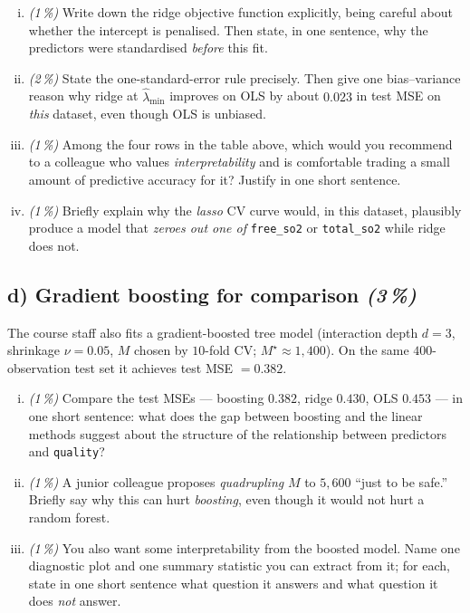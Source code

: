 \documentclass[11pt,a4paper]{article}
\newcommand{\subpoints}[1]{\textit{(#1\,\%)}}
\begin{document}
\begin{enumerate}[(i)]
  \item \subpoints{1} Write down the ridge objective function explicitly, being careful about whether the intercept is penalised. Then state, in one sentence, why the predictors were standardised \emph{before} this fit.

  \item \subpoints{2} State the one-standard-error rule precisely. Then give one bias--variance reason why ridge at $\hat\lambda_{\min}$ improves on OLS by about $0.023$ in test MSE on \emph{this} dataset, even though OLS is unbiased.

  \item \subpoints{1} Among the four rows in the table above, which would you recommend to a colleague who values \emph{interpretability} and is comfortable trading a small amount of predictive accuracy for it? Justify in one short sentence.

  \item \subpoints{1} Briefly explain why the \emph{lasso} CV curve would, in this dataset, plausibly produce a model that \emph{zeroes out one of} \texttt{free\_so2} or \texttt{total\_so2} while ridge does not.
\end{enumerate}

\subsection*{d) Gradient boosting for comparison \subpoints{3}}
The course staff also fits a gradient-boosted tree model (interaction depth $d = 3$, shrinkage $\nu = 0.05$, $M$ chosen by $10$-fold CV; $M^\star \approx 1{,}400$). On the same $400$-observation test set it achieves test MSE $= 0.382$.
\begin{enumerate}[(i)]
  \item \subpoints{1} Compare the test MSEs --- boosting $0.382$, ridge $0.430$, OLS $0.453$ --- in one short sentence: what does the gap between boosting and the linear methods suggest about the structure of the relationship between predictors and \texttt{quality}?

  \item \subpoints{1} A junior colleague proposes \emph{quadrupling} $M$ to $5{,}600$ ``just to be safe.'' Briefly say why this can hurt \emph{boosting}, even though it would not hurt a random forest.

  \item \subpoints{1} You also want some interpretability from the boosted model. Name one diagnostic plot and one summary statistic you can extract from it; for each, state in one short sentence what question it answers and what question it does \emph{not} answer.
\end{enumerate}
\end{document}
